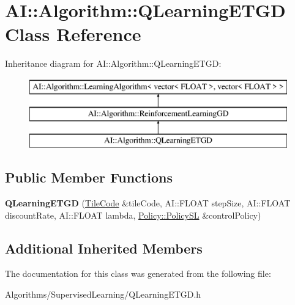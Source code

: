 \hypertarget{classAI_1_1Algorithm_1_1QLearningETGD}{\section{A\-I\-:\-:Algorithm\-:\-:Q\-Learning\-E\-T\-G\-D Class Reference}
\label{classAI_1_1Algorithm_1_1QLearningETGD}
}
Inheritance diagram for A\-I\-:\-:Algorithm\-:\-:Q\-Learning\-E\-T\-G\-D\-:\begin{figure}[H]
\begin{center}
\leavevmode
\includegraphics[height=3.000000cm]{classAI_1_1Algorithm_1_1QLearningETGD}
\end{center}
\end{figure}
\subsection*{Public Member Functions}
\begin{DoxyCompactItemize}
\item 
\hypertarget{classAI_1_1Algorithm_1_1QLearningETGD_ae36fe58b069fb5f9b36f4e7a5b3c8e09}{{\bfseries Q\-Learning\-E\-T\-G\-D} (\hyperlink{classAI_1_1Algorithm_1_1TileCode}{Tile\-Code} \&tile\-Code, A\-I\-::\-F\-L\-O\-A\-T step\-Size, A\-I\-::\-F\-L\-O\-A\-T discount\-Rate, A\-I\-::\-F\-L\-O\-A\-T lambda, \hyperlink{classAI_1_1Algorithm_1_1Policy_1_1Policy}{Policy\-::\-Policy\-S\-L} \&control\-Policy)}\label{classAI_1_1Algorithm_1_1QLearningETGD_ae36fe58b069fb5f9b36f4e7a5b3c8e09}

\end{DoxyCompactItemize}
\subsection*{Additional Inherited Members}


The documentation for this class was generated from the following file\-:\begin{DoxyCompactItemize}
\item 
Algorithms/\-Supervised\-Learning/Q\-Learning\-E\-T\-G\-D.\-h\end{DoxyCompactItemize}
